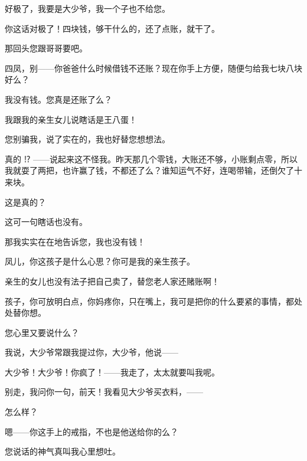 好极了，我要是大少爷，我一个子也不给您。

你这话对极了！四块钱，够干什么的，还了点账，就干了。

那回头您跟哥哥要吧。

四凤，别——你爸爸什么时候借钱不还账？现在你手上方便，随便匀给我七块八块好么？

我没有钱。您真是还账了么？

我跟我的亲生女儿说瞎话是王八蛋！

您别骗我，说了实在的，我也好替您想想法。

真的 ⁉ ——说起来这不怪我。昨天那几个零钱，大账还不够，小账剩点零，所以我就耍了两把，也许赢了钱，不都还了么？谁知运气不好，连喝带输，还倒欠了十来块。

这是真的？

这可一句瞎话也没有。

那我实实在在地告诉您，我也没有钱！


凤儿，你这孩子是什么心思？你可是我的亲生孩子。

亲生的女儿也没有法子把自己卖了，替您老人家还赌账啊！

孩子，你可放明白点，你妈疼你，只在嘴上，我可是把你的什么要紧的事情，都处处替你想。

您心里又要说什么？

我说，大少爷常跟我提过你，大少爷，他说——

大少爷！大少爷！你疯了！——我走了，太太就要叫我呢。

别走，我问你一句，前天！我看见大少爷买衣料，——

怎么样？

嗯——你这手上的戒指，不也是他送给你的么？

您说话的神气真叫我心里想吐。


